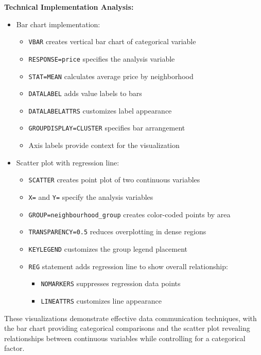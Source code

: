 \documentclass{article}
\begin{document}
\noindent
\textbf{Technical Implementation Analysis:}
\begin{itemize}[leftmargin=*]
    \item Bar chart implementation:
    \begin{itemize}
        \item \texttt{VBAR} creates vertical bar chart of categorical variable
        \item \texttt{RESPONSE=price} specifies the analysis variable
        \item \texttt{STAT=MEAN} calculates average price by neighborhood
        \item \texttt{DATALABEL} adds value labels to bars
        \item \texttt{DATALABELATTRS} customizes label appearance
        \item \texttt{GROUPDISPLAY=CLUSTER} specifies bar arrangement
        \item Axis labels provide context for the visualization
    \end{itemize}

    \item Scatter plot with regression line:
    \begin{itemize}
        \item \texttt{SCATTER} creates point plot of two continuous variables
        \item \texttt{X=} and \texttt{Y=} specify the analysis variables
        \item \texttt{GROUP=neighbourhood\_group} creates color-coded points by area
        \item \texttt{TRANSPARENCY=0.5} reduces overplotting in dense regions
        \item \texttt{KEYLEGEND} customizes the group legend placement
        \item \texttt{REG} statement adds regression line to show overall relationship:
        \begin{itemize}
            \item \texttt{NOMARKERS} suppresses regression data points
            \item \texttt{LINEATTRS} customizes line appearance
        \end{itemize}
    \end{itemize}
\end{itemize}

These visualizations demonstrate effective data communication techniques, with the bar chart providing categorical comparisons and the scatter plot revealing relationships between continuous variables while controlling for a categorical factor.
\end{document}
